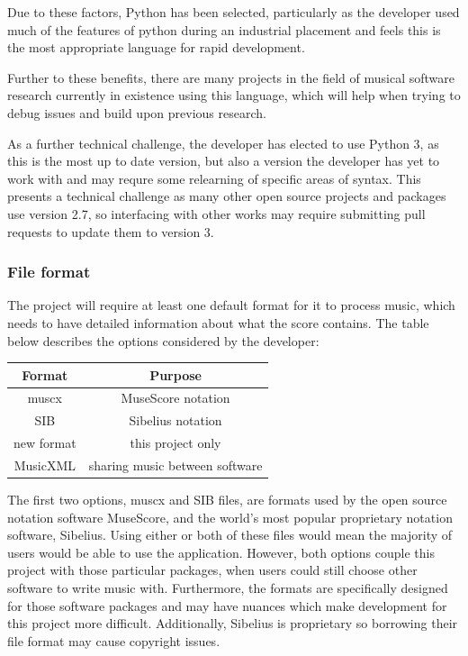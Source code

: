 Due to these factors, Python has been selected, particularly as the developer used much of the features of python during an industrial placement and feels this is the most appropriate language for rapid development.

Further to these benefits, there are many projects in the field of musical software research currently in existence using this language, \parencite{pmus} which will help when trying to debug issues and build upon previous research.

As a further technical challenge, the developer has elected to use Python 3, as this is the most up to date version, but also a version the developer has yet to work with and may requre some relearning of specific areas of syntax. This presents a technical challenge as many other open source projects and packages use version 2.7, so interfacing with other works may require submitting pull requests to update them to version 3.

\subsubsection{File format}
The project will require at least one default format for it to process music, which needs to have detailed information about what the score contains. The table below describes the options considered by the developer:

\begin{center}
\begin{tabular}{| c | c | } \hline
  {Format} & {Purpose} \\ \hline
  muscx & MuseScore notation \\ \hline
  SIB & Sibelius notation \\ \hline
  new format & this project only \\ \hline
  MusicXML & sharing music between software \\ \hline
\end{tabular}
\end{center}
The first two options, muscx and SIB files, are formats used by the open source notation software MuseScore\parencite{MuseTour}, and the world's most popular proprietary notation software, Sibelius\parencite{avid}. Using either or both of these files would mean the majority of users would be able to use the application. 
However, both options couple this project with those particular packages, when users could still choose other software to write music with. Furthermore, the formats are specifically designed for those software packages and may have nuances which make development for this project more difficult. Additionally, Sibelius is proprietary so borrowing their file format may cause copyright issues.

